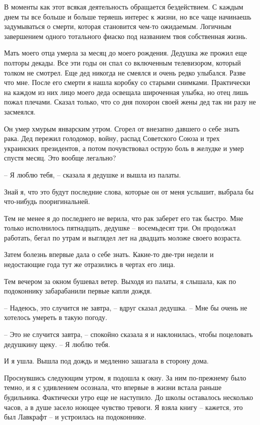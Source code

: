 \documentclass[
]{book}
\begin{document}
В моменты как этот всякая деятельность обращается бездействием. С каждым днем ты все больше и больше теряешь интерес к жизни, но все чаще начинаешь задумываться о смерти, которая становится чем-то ожидаемым. Логичным завершением одного тотального фиаско под названием твоя собственная жизнь.

Мать моего отца умерла за месяц до моего рождения. Дедушка же прожил еще полторы декады. Все эти годы он спал со включенным телевизором, который толком не смотрел. Еще дед никогда не смеялся и очень редко улыбался. Разве что мне. После его смерти я нашла коробку со старыми снимками. Практически на каждом из них лицо моего деда освещала широченная улыбка, но отец лишь пожал плечами. Сказал только, что со дня похорон своей жены дед так ни разу не засмеялся.

Он умер хмурым январским утром. Сгорел от внезапно давшего о себе знать рака. Дед пережил голодомор, войну, распад Советского Союза и трех украинских президентов, а потом почувствовал острую боль в желудке и умер спустя месяц. Это вообще легально?

-- Я люблю тебя, -- сказала я дедушке и вышла из палаты.

Знай я, что это будут последние слова, которые он от меня услышит, выбрала бы что-нибудь пооригинальней.

Тем не менее я до последнего не верила, что рак заберет его так быстро. Мне только исполнилось пятнадцать, дедушке -- восемьдесят три. Он продолжал работать, бегал по утрам и выглядел лет на двадцать моложе своего возраста.

Затем болезнь впервые дала о себе знать. Какие-то две-три недели и недостающие года тут же отразились в чертах его лица.

Тем вечером за окном бушевал ветер. Выходя из палаты, я слышала, как по подоконнику забарабанили первые капли дождя.

-- Надеюсь, это случится не завтра, -- вдруг сказал дедушка. -- Мне бы очень не хотелось умереть в такую погоду.

-- Это не случится завтра, -- спокойно сказала я и наклонилась, чтобы поцеловать дедушкину щеку. -- Я люблю тебя.

И я ушла. Вышла под дождь и медленно зашагала в сторону дома.

Проснувшись следующим утром, я подошла к окну. За ним по-прежнему было темно, и я с удивлением осознала, что впервые в жизни встала раньше будильника. Фактически утро еще не наступило. До школы оставалось несколько часов, а в душе засело ноющее чувство тревоги. Я взяла книгу -- кажется, это был Лавкрафт -- и устроилась на подоконнике.
\end{document}
